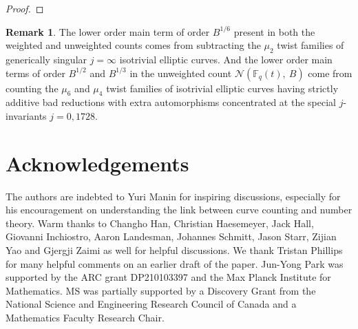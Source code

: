 \documentclass[a4paper,12pt]{amsart}
\theoremstyle{definition}
\newtheorem{rmk}[thm]{Remark}
\newcommand{\Nc}{\mathcal{N}}
\newcommand{\Fb}{\mathbb{F}}
\begin{document}
\begin{proof}

		
	\end{proof}
	
	\begin{rmk}
		The lower order main term of order $B^{1/6}$ present in both the weighted and unweighted counts comes from subtracting the $\mu_2$ twist families of generically singular $j = \infty$ isotrivial elliptic curves. And the lower order main terms of order $B^{1/2}$ and $B^{1/3}$ in the unweighted count $\Nc(\Fb_q(t),~B)$ come from counting the $\mu_6$ and $\mu_4$ twist families of isotrivial elliptic curves having strictly additive bad reductions with extra automorphisms concentrated at the special $j$-invariants $j = 0, 1728$.
	\end{rmk}
	
	
	\section*{Acknowledgements}
	The authors are indebted to Yuri Manin for inspiring discussions, especially for his encouragement on understanding the link between curve counting and number theory. Warm thanks to Changho Han, Christian Haesemeyer, Jack Hall, Giovanni Inchiostro, Aaron Landesman, Johannes Schmitt, Jason Starr, Zijian Yao and Gjergji Zaimi as well for helpful discussions. We thank Tristan Phillips for many helpful comments on an earlier draft of the paper. Jun-Yong Park was supported by the ARC grant DP210103397 and the Max Planck Institute for Mathematics. MS was partially supported by a Discovery Grant from the National Science and Engineering Research Council of Canada and a Mathematics Faculty Research Chair.
	
\end{document}
